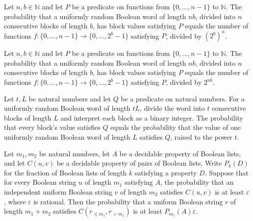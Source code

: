 \begin{theorem}
\label{Randomized.randProb_blocks}
\leanok
{}
Let $n,b\in\mathbb{N}$ and let $P$ be a predicate on functions from $\{0,\ldots,n-1\}$
to $\mathbb{N}$. The probability that a uniformly random Boolean word of length $nb$,
divided into $n$ consecutive blocks of length $b$, has block values satisfying $P$
equals the number of functions $f:\{0,\ldots,n-1\}\to\{0,\ldots,2^b-1\}$ satisfying $P$,
divided by $(2^b)^n$.
\end{theorem}

\begin{theorem}
\label{Randomized.randProb_blocks_piFinset}
\leanok
{}
Let $n,b\in\mathbb{N}$ and let $P$ be a predicate on functions from $\{0,\ldots,n-1\}$
to $\mathbb{N}$. The probability that a uniformly random Boolean word of length $nb$,
divided into $n$ consecutive blocks of length $b$, has block values satisfying $P$
equals the number of functions $f:\{0,\ldots,n-1\}\to\{0,\ldots,2^b-1\}$ satisfying $P$,
divided by $2^{nb}$.
\end{theorem}

\begin{theorem}
\label{Randomized.randProb_forall_blocks}
\leanok
{}
Let $t,L$ be natural numbers and let $Q$ be a predicate on natural numbers. For a
uniformly random Boolean word of length $tL$, divide the word into $t$ consecutive
blocks of length $L$ and interpret each block as a binary integer. The probability that
every block's value satisfies $Q$ equals the probability that the value of one uniformly
random Boolean word of length $L$ satisfies $Q$, raised to the power $t$.
\end{theorem}

\begin{theorem}
\label{Randomized.randProb_append_ge}
\leanok
{}
Let $m_1,m_2$ be natural numbers, let $A$ be a decidable property of Boolean lists, and
let $C(u,v)$ be a decidable property of pairs of Boolean lists. Write $P_k(D)$ for the
fraction of Boolean lists of length $k$ satisfying a property $D$. Suppose that for
every Boolean string $u$ of length $m_1$ satisfying $A$, the probability that an
independent uniform Boolean string $v$ of length $m_2$ satisfies $C(u,v)$ is at least
$\varepsilon$, where $\varepsilon$ is rational. Then the probability that a uniform
Boolean string $r$ of length $m_1+m_2$ satisfies $C(r_{\le m_1},r_{>m_1})$ is at least
$P_{m_1}(A)\varepsilon$.
\end{theorem}

